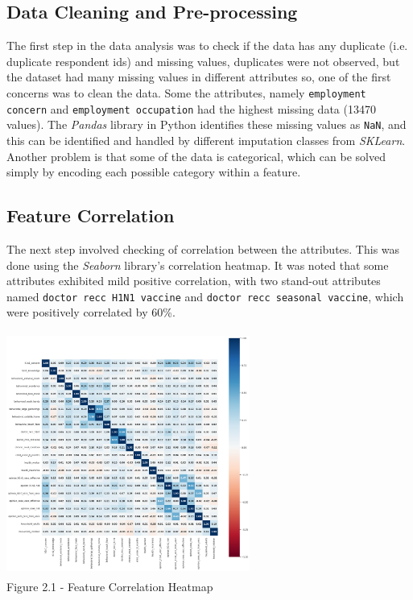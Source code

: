 \documentclass{IEEEtran}
\begin{document}
\subsection{Data Cleaning and Pre-processing}
The first step in the data analysis was to check if the data has any duplicate (i.e. duplicate respondent ids) and missing values, duplicates were not observed, but the dataset had many missing values in different attributes so, one of the first concerns was to clean the data. Some the attributes, namely \texttt{employment concern} and \texttt{employment occupation} had the highest missing data (13470 values). The \textit{Pandas} library in Python identifies these missing values as \texttt{NaN}, and this can be identified and handled by different imputation classes from \textit{SKLearn}. Another problem is that some of the data is categorical, which can be solved simply by encoding each possible category within a feature.

\subsection{Feature Correlation}
The next step involved checking of correlation  between the attributes. This was done using the \textit{Seaborn} library's correlation heatmap. It was noted that some attributes exhibited mild positive correlation, with two stand-out attributes named \texttt{doctor recc H1N1 vaccine} and \texttt{doctor recc seasonal vaccine}, which were positively correlated by 60\%.

\begin{center}
    \includegraphics[width = 8cm,height=8cm]{figures/Heatmap.png}\\  
    Figure 2.1 - Feature Correlation Heatmap
\end{center}
\end{document}
